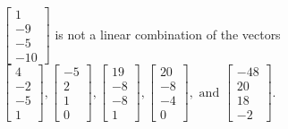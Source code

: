 \begin{exercise}
\begin{exerciseStatement}
  \end{exerciseStatement}
  \begin{exerciseAnswer}
   \(\left[\begin{array}{c}
1 \\
-9 \\
-5 \\
-10
\end{array}\right]\) 
  	 is not  
	a linear combination of the vectors \(\left[\begin{array}{c}
4 \\
-2 \\
-5 \\
1
\end{array}\right] , \left[\begin{array}{c}
-5 \\
2 \\
1 \\
0
\end{array}\right] , \left[\begin{array}{c}
19 \\
-8 \\
-8 \\
1
\end{array}\right] , \left[\begin{array}{c}
20 \\
-8 \\
-4 \\
0
\end{array}\right] , \text{ and } \left[\begin{array}{c}
-48 \\
20 \\
18 \\
-2
\end{array}\right]\).

	
  


  \end{exerciseAnswer}
\end{exercise}